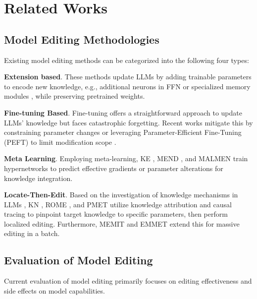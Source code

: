 \section{Related Works}

\subsection{Model Editing Methodologies}

Existing model editing methods can be categorized into the following four types:

\noindent\textbf{Extension based}.
These methods update LLMs by adding trainable parameters to encode new knowledge, e.g., additional neurons in FFN  \cite{dong-etal-2022-calibrating, huang2023transformerpatcher} or specialized memory modules \cite{hartvigsen2023aging, wang2024wise}, while preserving pretrained weights.

\noindent\textbf{Fine-tuning Based}.
Fine-tuning offers a straightforward approach to update LLMs' knowledge but faces catastrophic forgetting.
Recent works mitigate this by constraining parameter changes \cite{zhu2020modifyingmemoriestransformermodels} or leveraging Parameter-Efficient Fine-Tuning (PEFT) \cite{han2024peft} to limit modification scope \cite{MELOaaai24,wang-etal-2024-roselora}.

\noindent\textbf{Meta Learning}.
Employing meta-learning, KE \cite{decao2021editing}, MEND \cite{mitchell2022fast}, and MALMEN \cite{tan23malmen} train hypernetworks to predict effective gradients or parameter alterations for knowledge integration. 

\noindent\textbf{Locate-Then-Edit}.
Based on the investigation of knowledge mechanisms in LLMs \cite{geva-etal-2021-transformer, geva-etal-2022-transformer}, KN \cite{dai2022knowledge}, ROME \cite{meng2023locating}, and PMET \cite{aaai24pmet} utilize knowledge attribution and causal tracing to pinpoint target knowledge to specific parameters, then perform localized editing.
Furthermore, MEMIT \cite{meng2023massediting} and EMMET \cite{gupta-etal-2024-unified} extend this for massive editing in a batch.

\subsection{Evaluation of Model Editing}

Current evaluation of model editing primarily focuses on editing effectiveness and side effects on model capabilities.

